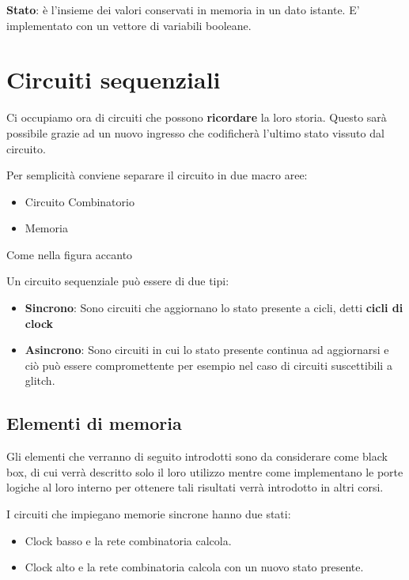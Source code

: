 \documentclass[a4paper]{book}
\begin{document}
\textbf{Stato}: è l'insieme dei valori conservati in memoria in un dato istante. E' implementato con un vettore di variabili booleane.



\section{Circuiti sequenziali}
Ci occupiamo ora di circuiti che possono \textbf{ricordare} la loro storia.
Questo sarà possibile grazie ad un nuovo ingresso che codificherà l'ultimo stato vissuto dal circuito.

Per semplicità conviene separare il circuito in due macro aree:

\begin{itemize}
\item Circuito Combinatorio
\item Memoria
\end{itemize}

Come nella figura accanto

Un circuito sequenziale può essere di due tipi:
\begin{itemize}
\item \textbf{Sincrono}: Sono circuiti che aggiornano lo stato presente a cicli, detti \textbf{cicli di clock}
\item \textbf{Asincrono}: Sono circuiti in cui lo stato presente continua ad aggiornarsi e ciò può essere compromettente per esempio nel caso di circuiti suscettibili a glitch.
\end{itemize}


\subsection{Elementi di memoria}

Gli elementi che verranno di seguito introdotti sono da considerare come black box, di cui verrà descritto solo il loro utilizzo mentre come implementano le porte logiche al loro interno per ottenere tali risultati verrà introdotto in altri corsi.

I circuiti che impiegano memorie sincrone hanno due stati:

\begin{itemize}
\item Clock basso e la rete combinatoria calcola.
\item Clock alto e  la rete combinatoria calcola con un nuovo stato presente.
\end{itemize}
\end{document}
